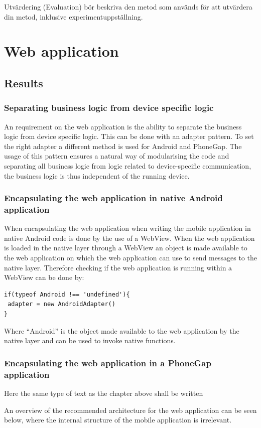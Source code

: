 Utvärdering (Evaluation) bör beskriva den metod som används för att utvärdera din metod, inklusive experimentuppställning.
\section{Web application} 
\subsection{Results}
\subsubsection{Separating business logic from device specific logic}
An requirement on the web application is the ability to separate the business logic from device specific logic. This can be done with an adapter pattern. To set the right adapter a different method is used for Android and PhoneGap. The usage of this pattern ensures a natural way of modularising the code and separating all business logic from logic related to device-specific communication, the business logic is thus independent of the running device. 

\subsubsection{Encapsulating the web application in native Android application}
When encapsulating the web application when writing the mobile application in native Android code is done by the use of a WebView. When the web application is loaded in the native layer through a WebView an object is made available to the web application on which the web application can use to send messages to the native layer. Therefore checking if the web application is running within a WebView can be done by:
\begin{verbatim}
if(typeof Android !== 'undefined'){
 adapter = new AndroidAdapter()
}
\end{verbatim}
Where “Android” is the object made available to the web application by the native layer and can be used to invoke native functions.

\subsubsection{Encapsulating the web application in a PhoneGap application}
Here the same type of text as the chapter above shall be written


An overview of the recommended architecture for the web application can be seen below, where the internal structure of the mobile application is irrelevant. 

